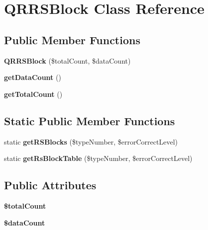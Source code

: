 \hypertarget{class_q_r_r_s_block}{}\section{Q\+R\+R\+S\+Block Class Reference}
\label{class_q_r_r_s_block}
\subsection*{Public Member Functions}
\begin{DoxyCompactItemize}
\item 
\mbox{\label{class_q_r_r_s_block_a01ad17c336f7349c1e6f3975bdf01972}} 
{\bfseries Q\+R\+R\+S\+Block} (\$total\+Count, \$data\+Count)
\item 
\mbox{\label{class_q_r_r_s_block_a02f11907bab93511f66163ece5641dc8}} 
{\bfseries get\+Data\+Count} ()
\item 
\mbox{\label{class_q_r_r_s_block_ac59baeeb9d8db956cde98f8ca2996f1d}} 
{\bfseries get\+Total\+Count} ()
\end{DoxyCompactItemize}
\subsection*{Static Public Member Functions}
\begin{DoxyCompactItemize}
\item 
\mbox{\label{class_q_r_r_s_block_afe01d5e08c2086c8177c5a69cc4562df}} 
static {\bfseries get\+R\+S\+Blocks} (\$type\+Number, \$error\+Correct\+Level)
\item 
\mbox{\label{class_q_r_r_s_block_ae540e51c67265978c8ce35c490ba616d}} 
static {\bfseries get\+Rs\+Block\+Table} (\$type\+Number, \$error\+Correct\+Level)
\end{DoxyCompactItemize}
\subsection*{Public Attributes}
\begin{DoxyCompactItemize}
\item 
\mbox{\label{class_q_r_r_s_block_aec42efde745da6dcb7604ef20c95db77}} 
{\bfseries \$total\+Count}
\item 
\mbox{\label{class_q_r_r_s_block_adda0ad6e0a16f0b8c957dfe69c3011e3}} 
{\bfseries \$data\+Count}
\end{DoxyCompactItemize}
